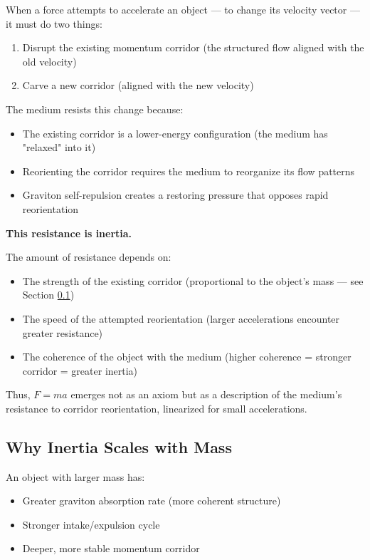 \documentclass[12pt, a4paper]{article}
\begin{document}
When a force attempts to accelerate an object — to change its velocity vector — it must do two things:

\begin{enumerate}
    \item Disrupt the existing momentum corridor (the structured flow aligned with the old velocity)
    \item Carve a new corridor (aligned with the new velocity)
\end{enumerate}

The medium resists this change because:
\begin{itemize}
    \item The existing corridor is a lower-energy configuration (the medium has "relaxed" into it)
    \item Reorienting the corridor requires the medium to reorganize its flow patterns
    \item Graviton self-repulsion creates a restoring pressure that opposes rapid reorientation
\end{itemize}

\textbf{This resistance is inertia.}

The amount of resistance depends on:
\begin{itemize}
    \item The strength of the existing corridor (proportional to the object's mass — see Section \ref{subsec:inertia_mass_scaling})
    \item The speed of the attempted reorientation (larger accelerations encounter greater resistance)
    \item The coherence of the object with the medium (higher coherence = stronger corridor = greater inertia)
\end{itemize}

Thus, \( F = ma \) emerges not as an axiom but as a description of the medium's resistance to corridor reorientation, linearized for small accelerations.

\subsection{Why Inertia Scales with Mass}
\label{subsec:inertia_mass_scaling}

An object with larger mass has:
\begin{itemize}
    \item Greater graviton absorption rate (more coherent structure)
    \item Stronger intake/expulsion cycle
    \item Deeper, more stable momentum corridor
\end{itemize}
\end{document}
